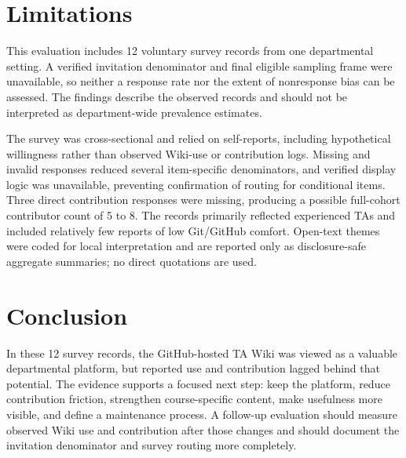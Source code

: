 \documentclass[11pt]{article}
\begin{document}
\section{Limitations}
This evaluation includes 12 voluntary survey records from one departmental setting. A verified invitation denominator and final eligible sampling frame were unavailable, so neither a response rate nor the extent of nonresponse bias can be assessed. The findings describe the observed records and should not be interpreted as department-wide prevalence estimates.

The survey was cross-sectional and relied on self-reports, including hypothetical willingness rather than observed Wiki-use or contribution logs. Missing and invalid responses reduced several item-specific denominators, and verified display logic was unavailable, preventing confirmation of routing for conditional items. Three direct contribution responses were missing, producing a possible full-cohort contributor count of 5 to 8. The records primarily reflected experienced TAs and included relatively few reports of low Git/GitHub comfort. Open-text themes were coded for local interpretation and are reported only as disclosure-safe aggregate summaries; no direct quotations are used.

\section{Conclusion}
In these 12 survey records, the GitHub-hosted TA Wiki was viewed as a valuable departmental platform, but reported use and contribution lagged behind that potential. The evidence supports a focused next step: keep the platform, reduce contribution friction, strengthen course-specific content, make usefulness more visible, and define a maintenance process. A follow-up evaluation should measure observed Wiki use and contribution after those changes and should document the invitation denominator and survey routing more completely.
\end{document}
